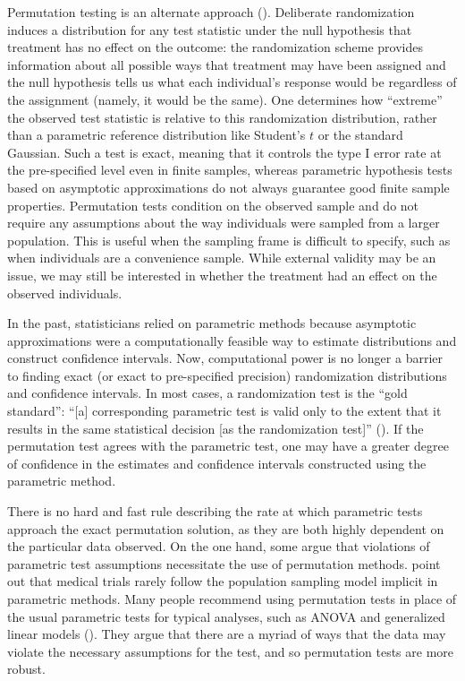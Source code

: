 \documentclass[12pt]{article}
\newcommand{\todo}[1]{{\color{red}{TO DO: \sc #1}}}
\begin{document}
Permutation testing is an alternate approach (\cite{fisher_design_1935, pitman_significance_1937,pitman_significance_1938}).
Deliberate randomization induces a distribution for any test statistic under the null hypothesis that treatment has no effect on the outcome:
the randomization scheme provides information about all possible ways that treatment may have been assigned 
and the null hypothesis tells us what each individual's response would be regardless of the assignment (namely, it would be the same).
One determines how ``extreme'' the observed test statistic is relative to this randomization distribution, rather than a parametric reference distribution like Student's $t$ or the standard Gaussian.
Such a test is exact, meaning that it controls the type I error rate at the pre-specified level even in finite samples, whereas parametric hypothesis tests based on asymptotic approximations do not always guarantee good finite sample properties.
Permutation tests condition on the observed sample and do not require any assumptions about the way individuals were sampled from a larger population.
This is useful when the sampling frame is difficult to specify, such as when individuals are a convenience sample.
While external validity may be an issue, we may still be interested in whether the treatment had an effect on the observed individuals.
\todo{clear?}

In the past, statisticians relied on parametric methods because asymptotic approximations were a computationally feasible way to estimate distributions and construct confidence intervals.
Now, computational power is no longer a barrier to finding exact (or exact to pre-specified precision) randomization distributions and confidence intervals.
In most cases, a randomization test is the ``gold standard'':
``[a] corresponding parametric test is valid only to the extent that it results in the same statistical decision [as the randomization test]'' (\cite{bradley_distribution_1968}).
If the permutation test agrees with the parametric test, one may have a greater degree of confidence in the estimates and confidence intervals constructed using the parametric method.

There is no hard and fast rule describing the rate at which parametric tests approach the exact permutation solution, as they are both highly dependent on the particular data observed.
On the one hand, some argue that violations of parametric test assumptions necessitate the use of permutation methods.
\cite{ludbrook_why_1998} point out that medical trials rarely follow the population sampling model implicit in parametric methods.
Many people recommend using permutation tests in place of the usual parametric tests for typical analyses, such as ANOVA and generalized linear models (\cite{still_approximate_1981, winkler_permutation_2014}).
They argue that there are a myriad of ways that the data may violate the necessary assumptions for the test, and so permutation tests are more robust.
\end{document}
